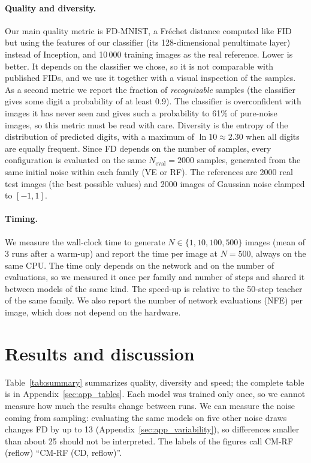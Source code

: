 \documentclass{article}
\begin{document}
\paragraph{Quality and diversity.} Our main quality metric is FD-MNIST, a
Fréchet distance computed like FID~\cite{heusel2017fid} but using the features of
our classifier (its 128-dimensional penultimate layer) instead of Inception, and
10\,000 training images as the real reference. Lower is better. It depends on
the classifier we chose, so it is not comparable with published FIDs, and we use
it together with a visual inspection of the samples. As a second metric we report
the fraction of \emph{recognizable} samples (the classifier gives some digit a
probability of at least 0.9). The classifier is overconfident with images it has
never seen and gives such a probability to 61\% of pure-noise images, so this
metric must be read with care. Diversity is the entropy of the distribution of
predicted digits, with a maximum of $\ln 10 \approx 2.30$ when all digits are
equally frequent. Since FD depends on the number of samples, every configuration
is evaluated on the same $N_\text{eval} = 2000$ samples, generated from the same
initial noise within each family (VE or RF). The references are 2000 real test
images (the best possible values) and 2000 images of Gaussian noise clamped to
$[-1, 1]$.

\paragraph{Timing.} We measure the wall-clock time to generate
$N \in \{1, 10, 100, 500\}$ images (mean of 3 runs after a warm-up) and report
the time per image at $N = 500$, always on the same CPU. The time only depends on
the network and on the number of evaluations, so we measured it once per family
and number of steps and shared it between models of the same kind. The speed-up
is relative to the 50-step teacher of the same family. We also report the number
of network evaluations (NFE) per image, which does not depend on the hardware.

\section{Results and discussion}
\label{sec:results}

Table~\ref{tab:summary} summarizes quality, diversity and speed; the complete
table is in Appendix~\ref{sec:app_tables}. Each model was trained only once, so
we cannot measure how much the results change between runs. We can measure the
noise coming from sampling: evaluating the same models on five other noise
draws changes FD by up to 13 (Appendix~\ref{sec:app_variability}), so differences
smaller than about 25 should not be interpreted. The labels of the figures call
CM-RF (reflow) ``CM-RF (CD, reflow)''.
\end{document}
